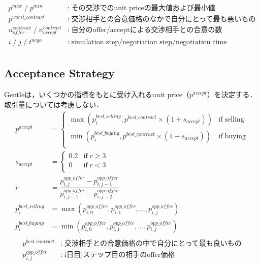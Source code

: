 \documentclass[uplatex, 10pt, a4j]{jsarticle}
\begin{document}
\begin{equation*}
    \begin{split}
        p^{max} \; / \; p^{min} &: \; \text{その交渉でのunit priceの最大値および最小値} \\
        p^{worst\_contract} &: \; \text{交渉相手との合意価格のなかで自分にとって最も悪いもの} \\
        n^{contract}_{offer} \; / \; n^{contract}_{accept} &: \; \text{自分のoffer/acceptによる交渉相手との合意の数} \\
        i \; / \; j \; / \; t^{nego} &: \; \text{simulation step/negotiation step/negotiation time} \\
    \end{split}
\end{equation*}

\subsection{\textrm{Acceptance Strategy}}
Gentleは，いくつかの指標をもとに受け入れるunit price（$p^{accept}$）を決定する．取引量については考慮しない．
\begin{equation*}
    \begin{split}
        p^{accept} &= \left\{\begin{array}{ll}
            \max \left(p^{best\_selling}_{i}, p^{best\_contract} \times \left(1+s_{accept}\right) \right) & \mathrm{if \; selling} \\ [3mm]
            \min \left(p^{best\_buying}_{i}, p^{best\_contract} \times \left(1-s_{accept}\right) \right)  & \mathrm{if \; buying}  \\
        \end{array}\right. \\
        s_{accept} &= \left\{\begin{array}{ll}
            0.2 & \mathrm{if} \; r \geq 3 \\
            0   & \mathrm{if} \; r < 3    \\
        \end{array}\right. \\
        r &= \dfrac{p^{opp\_offer}_{i,j} - p^{opp\_offer}_{i,j-1}}{p^{opp\_offer}_{i,j-1} - p^{opp\_offer}_{i,j-2}} \\
        p^{best\_selling}_{i} &= \max\left(p^{opp\_offer}_{i,0}, p^{opp\_offer}_{i,1}, \dots, p^{opp\_offer}_{i,j}\right) \\
        p^{best\_buying}_{i} &= \min\left(p^{opp\_offer}_{i,0}, p^{opp\_offer}_{i,1}, \dots, p^{opp\_offer}_{i,j}\right) \\
    \end{split}
\end{equation*}
\begin{equation*}
    \begin{split}
        p^{best\_contract} &: \; \text{交渉相手との合意価格の中で自分にとって最も良いもの} \\
        p^{opp\_offer}_{i,j} &: \; \text{i日目jステップ目の相手のoffer価格}
    \end{split}
\end{equation*}
\end{document}
